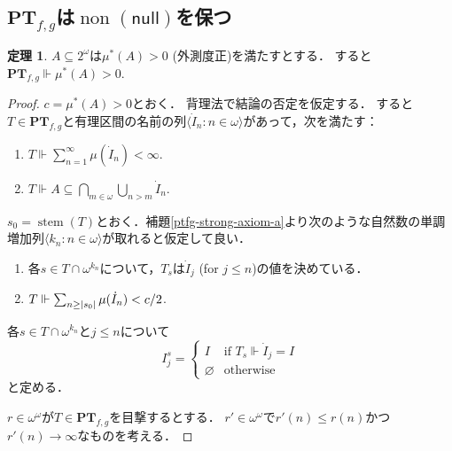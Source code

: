\documentclass[uplatex]{jsarticle}
\newcommand\forces{\Vdash}
\newcommand{\non}{\operatorname{non}}
\newcommand{\nul}{\mathsf{null}}
\newcommand{\stem}{\operatorname{stem}}
\newcommand{\PTfg}{\mathbf{PT}_{f,g}}
\newcommand{\seq}[1]{{\langle#1\rangle}}
\DeclarePairedDelimiter\abs{\lvert}{\rvert}
\renewcommand\emptyset{\varnothing}
\renewcommand\subset{\subseteq}
\theoremstyle{definition}
\newtheorem{thm}{定理}[section]
\begin{document}
	\subsection{$\PTfg$は$\non(\nul)$を保つ}
	
	\begin{thm}
		$A \subset 2^\omega$は$\mu^*(A) > 0$ (外測度正)を満たすとする．
		すると$\PTfg \forces \mu^*(A) > 0$.
	\end{thm}
	\begin{proof}
		$c = \mu^*(A) > 0$とおく．
		背理法で結論の否定を仮定する．
		すると$T \in \PTfg$と有理区間の名前の列$\seq{\dot{I}_n : n \in \omega}$があって，次を満たす：
		\begin{enumerate}
			\item $T \forces \sum_{n=1}^\infty \mu(\dot{I}_n) < \infty$.
			\item $T \forces A \subset \bigcap_{m \in \omega} \bigcup_{n > m} \dot{I}_n$.
		\end{enumerate}
		$s_0 = \stem(T)$とおく．補題\ref{ptfg-strong-axiom-a}より次のような自然数の単調増加列$\seq{k_n : n \in \omega}$が取れると仮定して良い．
		\begin{enumerate}
			\item 各$s \in T \cap \omega^{k_n}$について，$T_s$は$\dot{I}_j$ (for $j \le n$)の値を決めている．
			\item $T \forces \sum_{n \ge \abs{s_0}} \mu(\dot{I}_n) < c/2$.
		\end{enumerate}
	
		各$s \in T \cap \omega^{k_n}$と$j \le n$について
		\[
		I^s_j = \begin{cases}
			I & \text{if $T_s \forces \dot{I}_j = I$} \\
			\emptyset & \text{otherwise}
		\end{cases}
		\]
		と定める．
		
		$r \in \omega^\omega$が$T \in \PTfg$を目撃するとする．
		$r' \in \omega^\omega$で$r'(n) \le r(n)$かつ$r'(n) \to \infty$なものを考える．
		

\end{proof}
\end{document}
